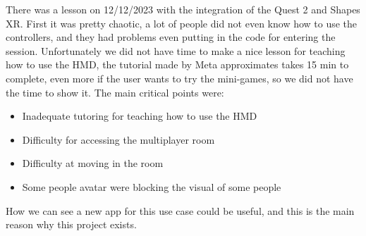 There was a lesson on 12/12/2023 with the integration of the Quest 2 and Shapes XR. First it was pretty chaotic, a lot of people did not even know how to use the controllers,
 and they had problems even putting in the code for entering the session. Unfortunately we did not have time to make a nice lesson for teaching how to use the HMD,
  the tutorial made by Meta approximates takes 15 min to complete, even more if the user wants to try the mini-games, so we did not have the time to show it. The main critical points were: 

\begin{itemize}
  \item Inadequate tutoring for teaching how to use the \ac{HMD}
  \item Difficulty for accessing the multiplayer room
  \item Difficulty at moving in the room
  \item Some people avatar were blocking the visual of some people
\end{itemize}
\noindent
How we can see a new app for this use case could be useful, and this is the main reason why this project exists. 